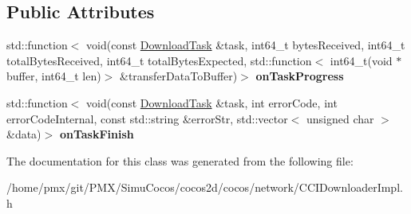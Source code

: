 \subsection*{Public Attributes}
\begin{DoxyCompactItemize}
\item 
\mbox{\label{classcocos2d_1_1network_1_1IDownloaderImpl_ad56c9e158b9c8855c296159edb720beb}} 
std\+::function$<$ void(const \hyperlink{classcocos2d_1_1network_1_1DownloadTask}{Download\+Task} \&task, int64\+\_\+t bytes\+Received, int64\+\_\+t total\+Bytes\+Received, int64\+\_\+t total\+Bytes\+Expected, std\+::function$<$ int64\+\_\+t(void $\ast$buffer, int64\+\_\+t len)$>$ \&transfer\+Data\+To\+Buffer)$>$ {\bfseries on\+Task\+Progress}
\item 
\mbox{\label{classcocos2d_1_1network_1_1IDownloaderImpl_ab38f75d5b3f8410f9937e8046e61a35a}} 
std\+::function$<$ void(const \hyperlink{classcocos2d_1_1network_1_1DownloadTask}{Download\+Task} \&task, int error\+Code, int error\+Code\+Internal, const std\+::string \&error\+Str, std\+::vector$<$ unsigned char $>$ \&data)$>$ {\bfseries on\+Task\+Finish}
\end{DoxyCompactItemize}


The documentation for this class was generated from the following file\+:\begin{DoxyCompactItemize}
\item 
/home/pmx/git/\+P\+M\+X/\+Simu\+Cocos/cocos2d/cocos/network/C\+C\+I\+Downloader\+Impl.\+h\end{DoxyCompactItemize}
